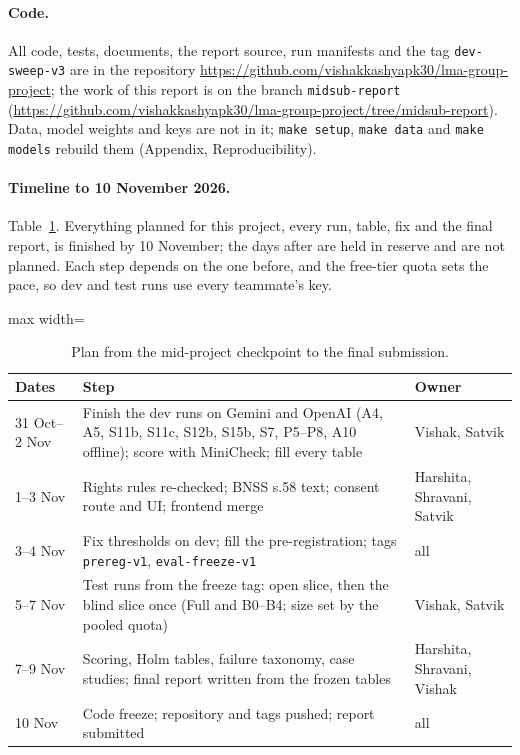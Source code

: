 \paragraph{Code.} All code, tests, documents, the report source, run manifests and the tag \texttt{dev-sweep-v3} are in the repository \url{https://github.com/vishakkashyapk30/lma-group-project}; the work of this report is on the branch \texttt{midsub-report} (\url{https://github.com/vishakkashyapk30/lma-group-project/tree/midsub-report}). Data, model weights and keys are not in it; \texttt{make setup}, \texttt{make data} and \texttt{make models} rebuild them (Appendix, Reproducibility).

\paragraph{Timeline to 10 November 2026.} Table~\ref{tab:timeline}. Everything planned for this project, every run, table, fix and the final report, is finished by 10 November; the days after are held in reserve and are not planned. Each step depends on the one before, and the free-tier quota sets the pace, so dev and test runs use every teammate's key.

\begin{table}[!t]
\centering\small
\begin{adjustbox}{max width=\textwidth}
\begin{tabular}{@{}p{1.5cm}p{4.2cm}p{1.2cm}@{}}
\toprule
Dates & Step & Owner \\
\midrule
31 Oct--2 Nov & Finish the dev runs on Gemini and OpenAI (A4, A5, S11b, S11c, S12b, S15b, S7, P5--P8, A10 offline); score with MiniCheck; fill every table & Vishak, Satvik \\
1--3 Nov & Rights rules re-checked; BNSS s.58 text; consent route and UI; frontend merge & Harshita, Shravani, Satvik \\
3--4 Nov & Fix thresholds on dev; fill the pre-registration; tags \texttt{prereg-v1}, \texttt{eval-freeze-v1} & all \\
5--7 Nov & Test runs from the freeze tag: open slice, then the blind slice once (Full and B0--B4; size set by the pooled quota) & Vishak, Satvik \\
7--9 Nov & Scoring, Holm tables, failure taxonomy, case studies; final report written from the frozen tables & Harshita, Shravani, Vishak \\
10 Nov & Code freeze; repository and tags pushed; report submitted & all \\
\bottomrule
\end{tabular}
\end{adjustbox}
\caption{Plan from the mid-project checkpoint to the final submission.}
\label{tab:timeline}
\end{table}

